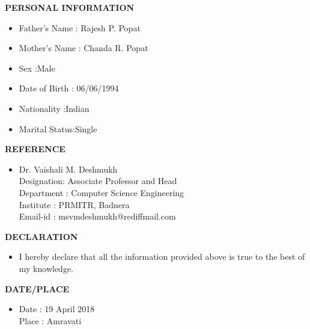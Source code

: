 \documentclass[a4paper,20pt]{article}
\newcommand{\lsep}{-0.5cm}
\begin{document}
\textbf{\large{PERSONAL INFORMATION }}\\[\lsep]
\begin{itemize}

		\item \noindent Father’s Name : Rajesh P. Popat
		\item \noindent Mother’s Name : Chanda R. Popat
		\item \noindent Sex :Male 
	 	\item\noindent Date of Birth : 06/06/1994
		\item \noindent Nationality :Indian 
	 	\item\noindent Marital Status:Single
	 

\end{itemize}

\textbf{\large{REFERENCE}} \\[\lsep]
\begin{itemize}
	\item[] 	
	Dr. Vaishali M. Deshmukh \\
	Designation: Associate Professor and Head\\
	Department : Computer Science Engineering\\
	Institute  : PRMITR, Badnera	\\
	Email-id   : msvmdeshmukh@rediffmail.com
	
\end{itemize}

\textbf{\large{DECLARATION}} \\[\lsep]
\begin{itemize}
 \item[] \noindent I hereby declare that all the information provided above is true to the best of my knowledge.

\end{itemize}

\textbf{\large{DATE/PLACE}} \\[\lsep]
\begin{itemize}
	
\item[] 	\noindent Date : 19 April 2018 \\	
	\noindent Place : Amravati	
	
\end{itemize}
\end{document}

